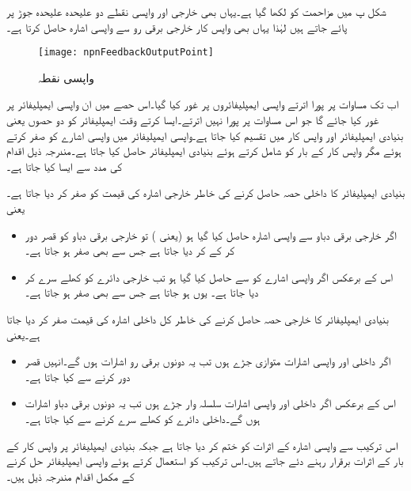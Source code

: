 شکل  پ میں مزاحمت  کو  لکھا گیا ہے۔یہاں بھی خارجی اور واپسی نقطے دو علیحدہ علیحدہ جوڑ پر پائے جاتے ہیں لہٰذا یہاں بھی واپس کار خارجی برقی رو  سے واپسی اشارہ حاصل کرتا ہے۔
\begin{figure}
\centering
\texttt{[image: npnFeedbackOutputPoint]}
\caption{واپسی نقطہ}
\label{شکل_واپسی_ٹرانزسٹر_واپسی_نکتہ}
\end{figure}


 \label{حصہ_واپسی_تفصیلی_تجزیہ}
اب تک مساوات  پر پورا اترتے واپسی ایمپلیفائروں پر غور کیا گیا۔اس حصے میں ان واپسی ایمپلیفائر پر غور کیا جائے گا جو اس مساوات پر پورا نہیں اترتے۔ایسا کرتے وقت ایمپلیفائر کو دو حصوں یعنی بنیادی ایمپلیفائر  اور واپس کار   میں تقسیم کیا جاتا ہے۔واپسی ایمپلیفائر میں واپسی اشارے کو صفر کرتے ہوئے مگر واپس کار کے بار کو شامل کرتے ہوئے بنیادی ایمپلیفائر حاصل کیا جاتا ہے۔مندرجہ ذیل اقدام کی مدد سے ایسا کیا جاتا ہے۔

بنیادی ایمپلیفائر کا داخلی حصہ حاصل کرنے کی خاطر خارجی اشارہ  کی قیمت کو صفر کر دیا جاتا ہے۔یعنی
\begin{itemize}
\item
اگر خارجی برقی دباو  سے واپسی اشارہ حاصل کیا گیا ہو (یعنی ) تو خارجی برقی دباو کو قصر دور کر کے  کر دیا جاتا ہے جس سے  بھی صفر ہو جاتا ہے۔
\item
اس کے برعکس اگر واپسی اشارے کو  سے حاصل کیا گیا ہو تب خارجی دائرے کو کھلے سرے کر دیا جاتا ہے۔ یوں  ہو جاتا ہے جس سے  بھی صفر ہو جاتا ہے۔
\end{itemize} 


بنیادی ایمپلیفائر کا خارجی حصہ حاصل کرنے کی خاطر کل داخلی اشارہ  کی قیمت صفر کر دیا جاتا ہے۔یعنی
\begin{itemize}
\item
اگر داخلی اور واپسی اشارات متوازی جڑے ہوں تب یہ دونوں برقی رو اشارات ہوں گے۔انہیں قصر دور کرنے سے  کیا جاتا ہے۔
\item
اس کے برعکس اگر داخلی اور واپسی اشارات سلسلہ وار جڑے ہوں تب یہ دونوں برقی دباو اشارات ہوں گے۔داخلی دائرے کو کھلے سرے کرنے سے  کیا جاتا ہے۔
\end{itemize} 
اس ترکیب سے واپسی اشارہ کے اثرات کو ختم کر دیا جاتا ہے جبکہ بنیادی ایمپلیفائر پر واپس کار کے بار کے اثرات برقرار رہنے دئے جاتے ہیں۔اس ترکیب کو استعمال کرتے ہوئے واپسی ایمپلیفائر حل کرنے کے مکمل اقدام مندرجہ ذیل ہیں۔


